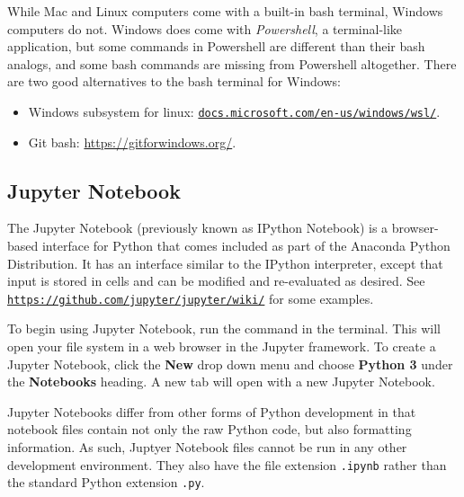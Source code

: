 \begin{info}
While Mac and Linux computers come with a built-in bash terminal, Windows computers do not.
Windows does come with \emph{Powershell}, a terminal-like application, but some commands in Powershell are different than their bash analogs, and some bash commands are missing from Powershell altogether.
There are two good alternatives to the bash terminal for Windows:
\begin{itemize}
\item Windows subsystem for linux: \href{https://docs.microsoft.com/en-us/windows/wsl/install-win10}{\texttt{docs.microsoft.com/en-us/windows/wsl/}}.
\item Git bash: \url{https://gitforwindows.org/}.
\end{itemize}
\end{info}

\subsection*{Jupyter Notebook} %

The Jupyter Notebook (previously known as IPython Notebook) is a browser-based interface for Python that comes included as part of the Anaconda Python Distribution.
It has an interface similar to the IPython interpreter, except that input is stored in cells and can be modified and re-evaluated as desired.
See \href{https://github.com/jupyter/jupyter/wiki/A-gallery-of-interesting-Jupyter-Notebooks}{\texttt{https://github.com/jupyter/jupyter/wiki/}} for some examples.

To begin using Jupyter Notebook, run the command  in the terminal.
This will open your file system in a web browser in the Jupyter framework.
To create a Jupyter Notebook, click the \textbf{New} drop down menu and choose \textbf{Python 3} under the \textbf{Notebooks} heading.
A new tab will open with a new Jupyter Notebook.

Jupyter Notebooks differ from other forms of Python development in that notebook files contain not only the raw Python code, but also formatting information.
As such, Juptyer Notebook files cannot be run in any other development environment.
They also have the file extension \texttt{.ipynb} rather than the standard Python extension \texttt{.py}.

